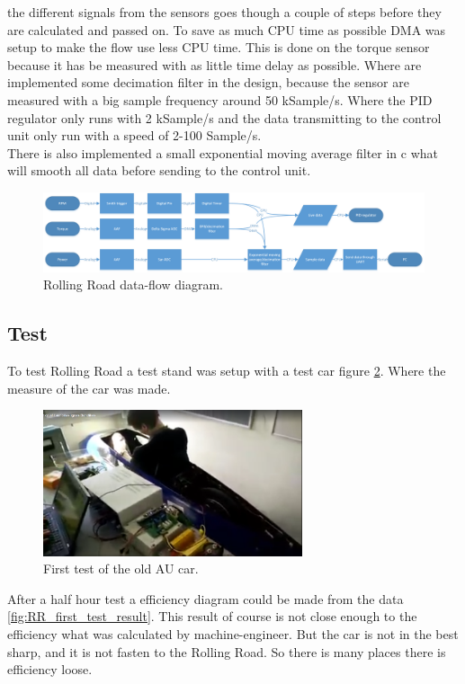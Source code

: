 the different signals from the sensors goes though a couple of steps before they are calculated and passed on. To save as much CPU time as possible DMA was setup to make the flow use less CPU time. This is done on the torque sensor because it has be measured with as little time delay as possible. Where are implemented some decimation filter in the design, because the sensor are measured with a big sample frequency around 50 kSample/s. Where the PID regulator only runs with 2 kSample/s and the data transmitting to the control unit only run with a speed of 2-100 Sample/s.\\
There is also implemented a small exponential moving average filter in c what will smooth all data before sending to the control unit.    
\begin{figure}[H]
	\centering
	\includegraphics [width=6in]{../Documentation_RR/Software/Pictures/data-flow.png}
	\caption{Rolling Road data-flow diagram.}
	\label{fig:data_flow_diagram}
\end{figure}
\subsection{Test}
To test Rolling Road a test stand was setup with a test car figure \ref{fig:RR_first_test}. Where the measure of the car was made. 
\begin{figure}[H]
	\centering
	\includegraphics [width=3in]{SubPages/Images/jens_test.png}
	\caption{First test of the old AU car.}
	\label{fig:RR_first_test}
\end{figure}
After a half hour test a efficiency diagram could be made from the data \ref{fig:RR_first_test_result}.
This result of course is not close enough to the efficiency what was calculated by machine-engineer. But the car is not in the best sharp, and it is not fasten to the Rolling Road. So there is many places there is efficiency loose.


